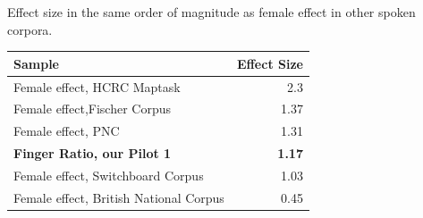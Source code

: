 \documentclass[a0,portrait]{a0poster}
\begin{document}
\begin{multicols}{2}
\noindent Effect size in the same order of magnitude as female effect in other spoken corpora.
\begin{center}
\begin{tabular}{l r}
\toprule
\textbf{Sample} & \textbf{Effect Size}\\
\midrule
Female effect, HCRC Maptask & 2.3\\
Female effect,Fischer Corpus & 1.37\\
Female effect, PNC & 1.31\\
\textbf{Finger Ratio, our Pilot 1} & \textbf{1.17}\\
Female effect, Switchboard Corpus & 1.03\\
Female effect, British National Corpus & 0.45\\
\bottomrule
\end{tabular}
\end{center}



\end{multicols}
\end{document}
